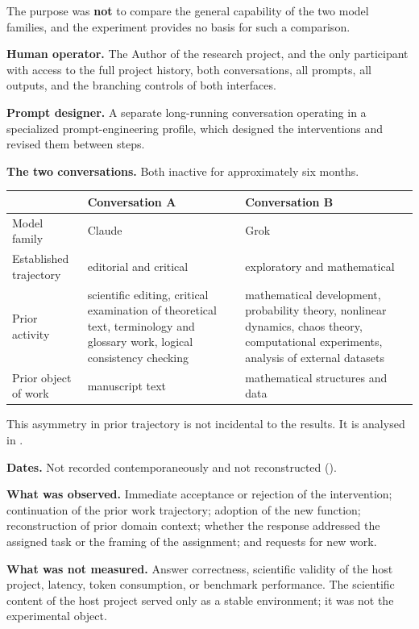 The purpose was \textbf{not} to compare the general capability of the two model families, and the experiment provides no basis for such a comparison.

\textbf{Human operator.} The Author of the research project, and the only participant with access to the full project history, both conversations, all prompts, all outputs, and the branching controls of both interfaces.

\textbf{Prompt designer.} A separate long-running conversation operating in a specialized prompt-engineering profile, which designed the interventions and revised them between steps.

\textbf{The two conversations.} Both inactive for approximately six months.

\begin{center}
\small
\begin{tabularx}{\linewidth}{>{\raggedright\arraybackslash}X>{\raggedright\arraybackslash}X>{\raggedright\arraybackslash}X}
\toprule
 & \textbf{Conversation A} & \textbf{Conversation B} \\
\midrule
Model family & Claude & Grok \\
Established trajectory & editorial and critical & exploratory and mathematical \\
Prior activity & scientific editing, critical examination of theoretical text, terminology and glossary work, logical consistency checking & mathematical development, probability theory, nonlinear dynamics, chaos theory, computational experiments, analysis of external datasets \\
Prior object of work & manuscript text & mathematical structures and data \\
\bottomrule
\end{tabularx}
\end{center}
This asymmetry in prior trajectory is not incidental to the results. It is analysed in .

\textbf{Dates.} Not recorded contemporaneously and not reconstructed ().

\textbf{What was observed.} Immediate acceptance or rejection of the intervention; continuation of the prior work trajectory; adoption of the new function; reconstruction of prior domain context; whether the response addressed the assigned task or the framing of the assignment; and requests for new work.

\textbf{What was not measured.} Answer correctness, scientific validity of the host project, latency, token consumption, or benchmark performance. The scientific content of the host project served only as a stable environment; it was not the experimental object.


